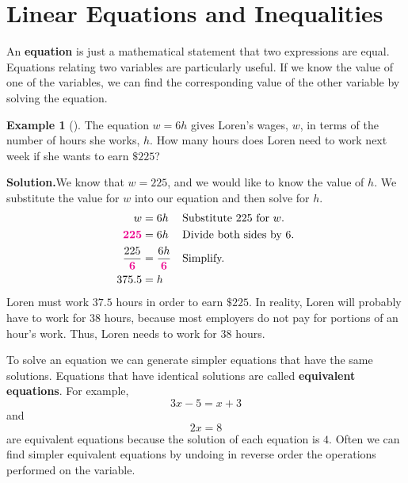 \documentclass[10pt,]{book}
\newcommand{\terminology}[1]{\textbf{#1}}
\theoremstyle{plain}
\theoremstyle{definition}
\theoremstyle{definition}
\newtheorem{example}[theorem]{Example}
\theoremstyle{definition}
\numberwithin{equation}{part}
\newcommand{\alert}[1]{\boldsymbol{\color{magenta}{#1}}}
\newcommand{\amp}{&}
\begin{document}
\section[{Linear Equations and Inequalities}]{Linear Equations and Inequalities}\label{appendix-Linear-Equations-and-Inequalities}
An \terminology{equation} is just a mathematical statement that two expressions are equal. Equations relating two variables are particularly useful. If we know the value of one of the variables, we can find the corresponding value of the other variable by solving the equation.%
\begin{example}[]\label{example-10}
The equation \(w = 6h\) gives Loren's wages, \(w\), in terms of the number of hours she works, \(h\). How many hours does Loren need to work next week if she wants to earn \(\$225\)?%
\par\medskip\noindent%
\textbf{Solution.}\quad We know that \(w = 225\), and we would like to know the value of \(h\). We substitute the value for \(w\) into our equation and then solve for \(h\).%
\begin{align*}
w \amp= 6h\amp\amp \text{Substitute 225 for }w.\\
\alert{225} \amp= 6h\amp\amp \text{Divide both sides by } 6.\\
\frac{225}{\alert{6}}\amp = \frac{6h}{\alert{6}}\amp\amp \text{Simplify.}\\
375.5\amp = h
\end{align*}
Loren must work \(37.5\) hours in order to earn \(\$225\). In reality, Loren will probably have to work for \(38\) hours, because most employers do not pay for portions of an hour's work. Thus, Loren needs to work for \(38\) hours.%
\end{example}
\par
To solve an equation we can generate simpler equations that have the same solutions. Equations that have identical solutions are called \terminology{equivalent equations}. For example,%
\begin{equation*}
3x − 5 = x + 3
\end{equation*}
and%
\begin{equation*}
2x = 8
\end{equation*}
are equivalent equations because the solution of each equation is \(4\). Often we can find simpler equivalent equations by undoing in reverse order the operations performed on the variable.%
\typeout{************************************************}
\typeout{************************************************}
\end{document}
